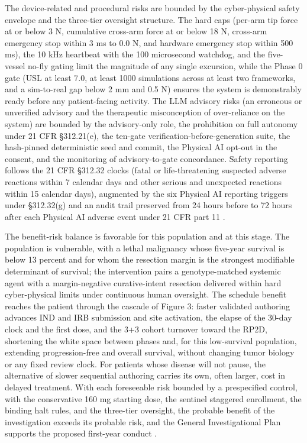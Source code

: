 The device-related and procedural risks are bounded by the cyber-physical safety
envelope and the three-tier oversight structure. The hard caps (per-arm tip force at
or below 3 N, cumulative cross-arm force at or below 18 N, cross-arm emergency stop
within 3 ms to 0.0 N, and hardware emergency stop within 500 ms), the 10 kHz
heartbeat with the 100 microsecond watchdog, and the five-vessel no-fly gating limit
the magnitude of any single excursion, while the Phase 0 gate (USL at least 7.0, at
least 1000 simulations across at least two frameworks, and a sim-to-real gap below 2
mm and 0.5 N) ensures the system is demonstrably ready before any patient-facing
activity. The LLM advisory risks (an erroneous or unverified advisory and the
therapeutic misconception of over-reliance on the system) are bounded by the
advisory-only role, the prohibition on full autonomy under 21 CFR \S 312.21(e), the
ten-gate verification-before-generation suite, the hash-pinned deterministic seed
and commit, the Physical AI opt-out in the consent, and the monitoring of
advisory-to-gate concordance. Safety reporting follows the 21 CFR \S 312.32 clocks
(fatal or life-threatening suspected adverse reactions within 7 calendar days and
other serious and unexpected reactions within 15 calendar days), augmented by the
six Physical AI reporting triggers under \S 312.32(g) and an audit trail preserved
from 24 hours before to 72 hours after each Physical AI adverse event under 21 CFR
part 11 \cite{cfr312paiuni,congress9510}.

The benefit-risk balance is favorable for this population and at this stage. The
population is vulnerable, with a lethal malignancy whose five-year survival is below
13 percent and for whom the resection margin is the strongest modifiable determinant
of survival; the intervention pairs a genotype-matched systemic agent with a
margin-negative curative-intent resection delivered within hard cyber-physical limits
under continuous human oversight. The schedule benefit reaches the patient through
the cascade of Figure 3: faster validated authoring advances IND and IRB submission
and site activation, the elapse of the 30-day clock and the first dose, and the 3+3
cohort turnover toward the RP2D, shortening the white space between phases and, for
this low-survival population, extending progression-free and overall survival,
without changing tumor biology or any fixed review clock. For patients whose disease
will not pause, the alternative of slower sequential authoring carries its own,
often larger, cost in delayed treatment. With each foreseeable risk bounded by a
prespecified control, with the conservative 160 mg starting dose, the sentinel
staggered enrollment, the binding halt rules, and the three-tier oversight, the
probable benefit of the investigation exceeds its probable risk, and the General
Investigational Plan supports the proposed first-year conduct \cite{pdac060s2030,daraxwhipple,clintrustpai}.

